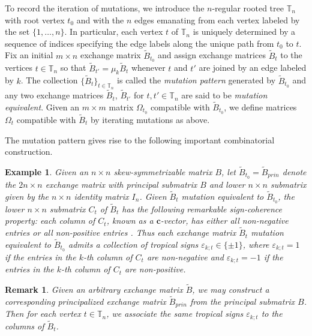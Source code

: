 \documentclass{amsart}
\newtheorem{remark}[theorem]{Remark}
\newtheorem{example}[theorem]{Example}
\numberwithin{equation}{section}
\newcommand{\bfc}{\mathbf{c}}
\newcommand{\bfx}{\mathbf{x}}
\newcommand{\TT}{\mathbb{T}}
\begin{document}
\newpage 

To record the iteration of mutations, we introduce the $n$-regular rooted tree $\TT_n$ with root vertex $t_0$ and with the $n$ edges emanating from each vertex labeled by the set $\{1,\ldots,n\}$.
In particular, each vertex $t$ of $\TT_n$ is uniquely determined by a sequence of indices specifying the edge labels along the unique path from $t_0$ to $t$.
Fix an initial $m\times n$ exchange matrix $\tilde B_{t_0}$ and assign exchange matrices $\tilde B_t$ to the vertices $t\in\TT_n$ so that $\tilde B_{t'}=\mu_k\tilde B_t$ whenever $t$ and $t'$ are joined by an edge labeled by $k$.
The collection $\{\tilde B_t\}_{t\in\TT_n}$ is called the \emph{mutation pattern} generated by $\tilde B_{t_0}$ and any two exchange matrices $\tilde B_t$, $\tilde B_{t'}$ for $t,t'\in\TT_n$ are said to be \emph{mutation equivalent}.
Given an $m\times m$ matrix $\Omega_{t_0}$ compatible with $\tilde B_{t_0}$, we define matrices $\Omega_t$ compatible with $\tilde B_t$ by iterating mutations as above.

The mutation pattern gives rise to the following important combinatorial construction.
\begin{example}
  Given an $n\times n$ skew-symmetrizable matrix $B$, let $\tilde B_{t_0}=\tilde B_{prin}$ denote the $2n\times n$ exchange matrix with principal submatrix $B$ and lower $n\times n$ submatrix given by the $n\times n$ identity matrix $I_n$.
  Given $\tilde B_t$ mutation equivalent to $\tilde B_{t_0}$, the lower $n\times n$ submatrix $C_t$ of $\tilde B_t$ has the following remarkable \emph{sign-coherence} property: each column of $C_t$, known as a $\bfc$-vector, has either all non-negative entries or all non-positive entries \cite{fomin-zelevinsky4,nakanishi-zelevinsky,gross-hacking-keel-kontsevich}.
  Thus each exchange matrix $\tilde B_t$ mutation equivalent to $\tilde B_{t_0}$ admits a collection of \emph{tropical signs} $\varepsilon_{k;t}\in\{\pm1\}$, where $\varepsilon_{k;t}=1$ if the entries in the $k$-th column of $C_t$ are non-negative and $\varepsilon_{k;t}=-1$ if the entries in the $k$-th column of $C_t$ are non-positive. 
\end{example}

\begin{remark}
  Given an arbitrary exchange matrix $\tilde B$, we may construct a corresponding principalized exchange matrix $\tilde B_{prin}$ from the principal submatrix $B$.
  Then for each vertex $t\in\TT_n$, we associate the same tropical signs $\varepsilon_{k;t}$ to the columns of $\tilde B_t$.
\end{remark}
\end{document}
